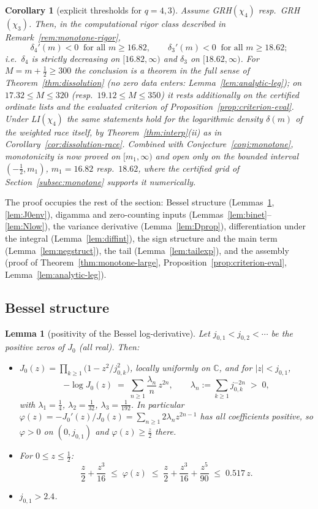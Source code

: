 \documentclass[11pt]{article}
\newtheorem{lemma}{Lemma}
\newtheorem{corollary}{Corollary}
\begin{document}
\begin{corollary}[explicit thresholds for $q=4,3$]
\label{cor:monotone-explicit}
Assume GRH$(\chi_4)$ resp.\ GRH$(\chi_3)$. Then, in the computational
rigor class described in Remark~\ref{rem:monotone-rigor},
\[
\delta_4'(m)<0\ \text{ for all } m\ge16.82,
\qquad
\delta_3'(m)<0\ \text{ for all } m\ge18.62 ;
\]
i.e.\ $\delta_4$ is strictly decreasing on $[16.82,\infty)$ and
$\delta_3$ on $[18.62,\infty)$. For $M=m+\tfrac12\ge300$ the
conclusion is a theorem in the full sense of
Theorem~\ref{thm:dissolution} (no zero data enters:
Lemma~\ref{lem:analytic-leg}); on $17.32\le M\le320$ (resp.\
$19.12\le M\le350$) it rests additionally on the certified ordinate
lists and the evaluated criterion of
Proposition~\ref{prop:criterion-eval}. Under LI$(\chi_4)$ the same
statements hold for the logarithmic density $\delta(m)$ of the
weighted race itself, by Theorem~\ref{thm:interp}(ii) as in
Corollary~\ref{cor:dissolution-race}. Combined with
Conjecture~\ref{conj:monotone}, monotonicity is now proved on
$[m_1,\infty)$ and open only on the bounded interval
$(-\tfrac12,m_1)$, $m_1=16.82$ resp.\ $18.62$, where the certified
grid of Section~\ref{subsec:monotone} supports it numerically.
\end{corollary}

The proof occupies the rest of the section: Bessel structure
(Lemmas~\ref{lem:phi}, \ref{lem:J0env}), digamma and zero-counting
inputs (Lemmas~\ref{lem:binet}--\ref{lem:Nlow}), the variance
derivative (Lemma~\ref{lem:Dprop}), differentiation under the
integral (Lemma~\ref{lem:diffint}), the sign structure and the main
term (Lemma~\ref{lem:negstruct}), the tail (Lemma~\ref{lem:tailexp}),
and the assembly (proof of Theorem~\ref{thm:monotone-large},
Proposition~\ref{prop:criterion-eval},
Lemma~\ref{lem:analytic-leg}).

\subsection*{Bessel structure}

\begin{lemma}[positivity of the Bessel log-derivative]\label{lem:phi}
Let $j_{0,1}<j_{0,2}<\cdots$ be the positive zeros of $J_0$ (all
real). Then:
\begin{itemize}
\item[(i)] $J_0(z)=\prod_{k\ge1}\bigl(1-z^2/j_{0,k}^2\bigr)$, locally
uniformly on $\mathbb C$, and for $|z|<j_{0,1}$,
\[
-\log J_0(z)\;=\;\sum_{n\ge1}\frac{\lambda_n}{n}\,z^{2n},
\qquad
\lambda_n:=\sum_{k\ge1}j_{0,k}^{-2n}\;>\;0,
\]
with $\lambda_1=\tfrac14$, $\lambda_2=\tfrac1{32}$,
$\lambda_3=\tfrac1{192}$. In particular
$\varphi(z)=-J_0'(z)/J_0(z)=\sum_{n\ge1}2\lambda_nz^{2n-1}$ has all
coefficients positive, so $\varphi>0$ on $(0,j_{0,1})$ and
$\varphi(z)\ge\tfrac z2$ there.
\item[(ii)] For $0\le z\le\tfrac12$:
\[
\frac z2+\frac{z^3}{16}\;\le\;\varphi(z)\;\le\;
\frac z2+\frac{z^3}{16}+\frac{z^5}{90}\;\le\;0.517\,z .
\]
\item[(iii)] $j_{0,1}>2.4$.
\end{itemize}
\end{lemma}
\end{document}
